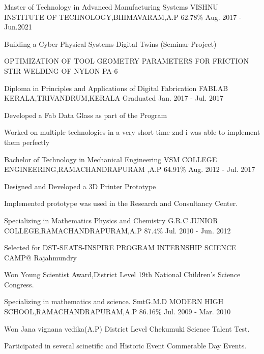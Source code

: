 \begin{cventries}
  \cventry
    {Master of Technology in Advanced Manufacturing Systems}
    {VISHNU INSTITUTE OF TECHNOLOGY,BHIMAVARAM,A.P}
    {62.78\%}
    {Aug. 2017 - Jun.2021}
    {
      \begin{cvitems}
        \item {Building a Cyber Physical Systems-Digital Twins (Seminar Project)}  
        \item {OPTIMIZATION OF TOOL GEOMETRY PARAMETERS FOR FRICTION STIR WELDING OF NYLON PA-6 }
      \end{cvitems}
    }
  \cventry
    {Diploma in Principles and Applications of Digital Fabrication}
    {FABLAB KERALA,TRIVANDRUM,KERALA}
    {Graduated}
    {Jan. 2017 - Jul. 2017}
    {
      \begin{cvitems}
        \item {Developed a Fab Data Glass as part of the Program }
        \item {Worked on multiple technologies in a very short time znd i was able to implement them perfectly}
      \end{cvitems}
    }
  \cventry
    {Bachelor of Technology in Mechanical Engineering}
    {VSM COLLEGE ENGINEERING,RAMACHANDRAPURAM ,A.P}
    {64.91\%}
    {Aug. 2012 - Jul. 2017}
    {
      \begin{cvitems}
        \item {Designed and Developed a 3D Printer Prototype }
        \item {Implemented prototype was used in the Research and Consultancy Center.}
      \end{cvitems} 
    }
  \cventry
    {Specializing in Mathematics Physics and Chemistry}
    {G.R.C JUNIOR COLLEGE,RAMACHANDRAPURAM,A.P}
    {87.4\%}
    {Jul. 2010 - Jun. 2012}
    {
      \begin{cvitems}
	\item{Selected for DST-SEATS-INSPIRE PROGRAM INTERNSHIP SCIENCE CAMP@ Rajahmundry}
        \item {Won Young Scientist Award,District Level 19th National Children's Science Congress.}
        \item {                                                                   }
      \end{cvitems}
    }
  \cventry
    {Specializing in mathematics and science.}
    {SmtG.M.D MODERN HIGH SCHOOL,RAMACHANDRAPURAM,A.P}
    {86.16\%}
    {Jul. 2009 - Mar. 2010}
    {
      \begin{cvitems}
        \item {Won Jana vignana vedika(A.P) District Level Chekumuki Science Talent Test.}
        \item {Participated in several scinetific and Historic Event Commerable Day Events.}
        \item {                                              }
      \end{cvitems}
}
\end{cventries}
